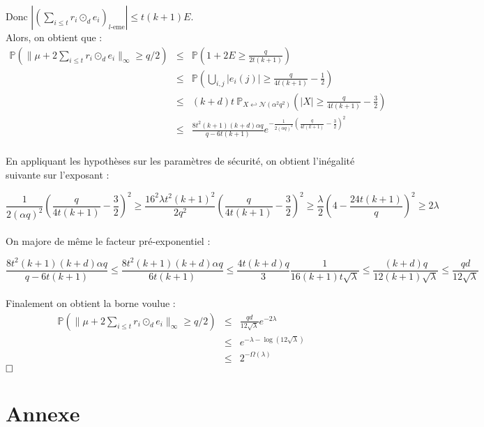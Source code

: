 \documentclass[11pt,a4paper]{article}
\begin{document}
Donc $|(\sum_{i \leq t}r_i \odot_d e_i)_{l\text{-eme}}|\leq t(k+1)E$. \\

Alors, on obtient que : 
\begin{eqnarray*}
\mathbb{P}(\|\mu + 2\sum_{i \leq t}r_i \odot_d e_i  \|_\infty \geq q/2 ) &\leq& \mathbb{P}(1+2E \geq \frac{q}{2t(k+1)}) \\
&\leq& \mathbb{P}(\bigcup_{i,j}|e_i(j)| \geq \frac{q}{4t(k+1)} - \frac{1}{2}) \\
&\leq& (k+d)t \ \mathbb{P}_{X \hookleftarrow \mathcal{N}(\alpha^2 q^2)}(|X| \geq \frac{q}{4t(k+1)} - \frac{3}{2}) \\
&\leq& \frac{8t^2(k+1)(k+d)\alpha q}{q - 6t(k+1)} e^{-\frac{1}{2(\alpha q)^2}(\frac{q}{4t(k+1)}-\frac{3}{2})^2} \\
\end{eqnarray*}

En appliquant les hypothèses sur les paramètres de sécurité, on obtient l'inégalité suivante sur l'exposant :

\[
\frac{1}{2(\alpha q)^2}(\frac{q}{4t(k+1)}-\frac{3}{2})^2 \geq \frac{16^2\lambda t^2(k+1)^2}{2q^2}(\frac{q}{4t(k+1)}-\frac{3}{2})^2 
\geq \frac{\lambda}{2}(4-\frac{24t(k+1)}{q})^2
\geq 2\lambda
\]
\\

On majore de même le facteur pré-exponentiel : 

\[
\frac{8t^2(k+1)(k+d)\alpha q}{q - 6t(k+1)} \leq \frac{8t^2(k+1)(k+d)\alpha q}{6t(k+1)}
\leq \frac{4t(k+d)q}{3}\frac{1}{16(k+1)t\sqrt{\lambda}} 
\leq \frac{(k+d)q}{12(k+1)\sqrt{\lambda}}
\leq \frac{qd}{12\sqrt{\lambda}}
\]
\\

Finalement on obtient la borne voulue :
\begin{eqnarray*}
\mathbb{P}(\|\mu + 2\sum_{i \leq t}r_i \odot_d e_i  \|_\infty \geq q/2 ) &\leq&  \frac{qd}{12\sqrt{\lambda}}e^{-2\lambda} \\
&\leq& e^{-\lambda-\log(12\sqrt{\lambda})} \\
&\leq& 2^{-\Omega(\lambda)}
\end{eqnarray*}
$\hfill \square$

\section*{Annexe}
\printbibliography[heading=bibintoc, title={Références}]
\end{document}
